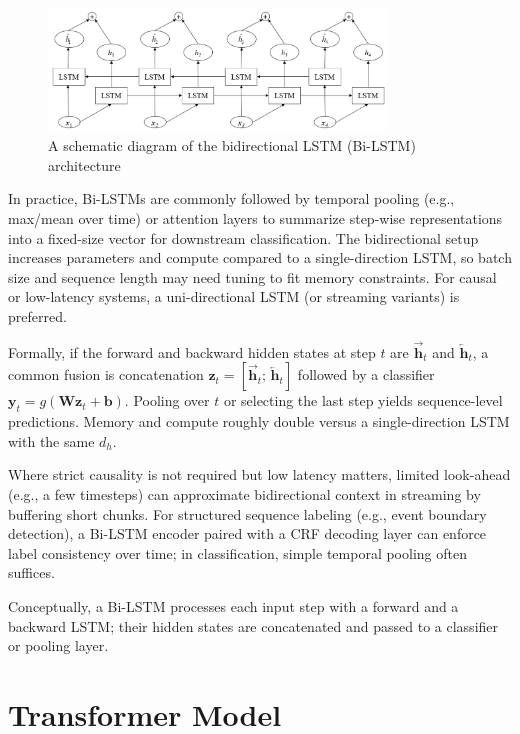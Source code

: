 \begin{figure}[!h]
\centering
\includegraphics[width=0.8\textwidth]{logos/BI-LSTM.png}
\caption[Bidirectional LSTM architecture]{A schematic diagram of the bidirectional LSTM (Bi-LSTM) architecture\cite{s21206758}}
\end{figure}

In practice, Bi-LSTMs are commonly followed by temporal pooling (e.g., max/mean over time) or attention layers to summarize step-wise representations into a fixed-size vector for downstream classification. The bidirectional setup increases parameters and compute compared to a single-direction LSTM, so batch size and sequence length may need tuning to fit memory constraints. For causal or low-latency systems, a uni-directional LSTM (or streaming variants) is preferred.

Formally, if the forward and backward hidden states at step \(t\) are \(\overrightarrow{\mathbf{h}}_t\) and \(\overleftarrow{\mathbf{h}}_t\), a common fusion is concatenation \(\mathbf{z}_t = [\overrightarrow{\mathbf{h}}_t;\,\overleftarrow{\mathbf{h}}_t]\) followed by a classifier \(\mathbf{y}_t = g(\mathbf{W}\mathbf{z}_t + \mathbf{b})\). Pooling over \(t\) or selecting the last step yields sequence-level predictions. Memory and compute roughly double versus a single-direction LSTM with the same \(d_h\).
\par
Where strict causality is not required but low latency matters, limited look-ahead (e.g., a few timesteps) can approximate bidirectional context in streaming by buffering short chunks. For structured sequence labeling (e.g., event boundary detection), a Bi-LSTM encoder paired with a CRF decoding layer can enforce label consistency over time; in classification, simple temporal pooling often suffices.

Conceptually, a Bi-LSTM processes each input step with a forward and a backward LSTM; their hidden states are concatenated and passed to a classifier or pooling layer.


\section{Transformer Model}
\label{sec:related_technologies:transformer}

